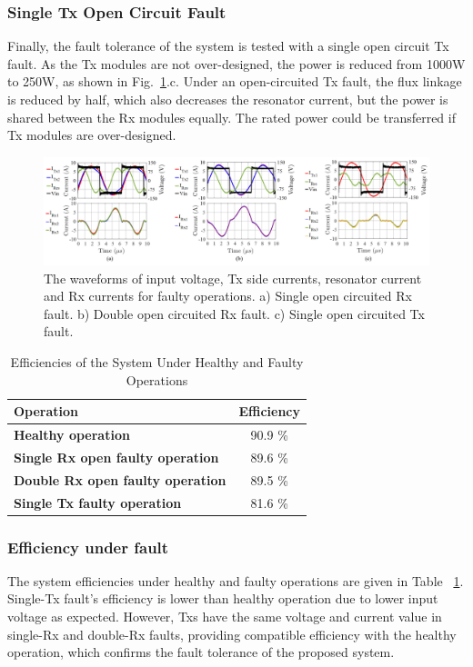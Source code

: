 \documentclass[journal]{IEEEtran}
\begin{document}
\subsubsection{Single Tx Open Circuit Fault}
Finally, the fault tolerance of the system is tested with a single open circuit Tx fault. 
As the Tx modules are not over-designed, the power is reduced from 1000W to 250W, as shown in Fig.~\ref{fig:results}.c.
Under an open-circuited Tx fault, the flux linkage is reduced by half, which also decreases the resonator current, but the power is shared between the Rx modules equally.
The rated power could be transferred if Tx modules are over-designed.

 \begin{figure}[]
     \centering
        	\includegraphics[width=1\linewidth]{faulty_new3.png}
        \caption{The waveforms of input voltage, Tx side currents, resonator current and Rx currents for faulty operations. a) Single open circuited Rx fault. b) Double open circuited Rx fault. c) Single open circuited Tx fault. }
        \label{fig:results}
\end{figure}

\begin{table}[h!]
\centering
\caption{Efficiencies of the System Under Healthy and Faulty Operations }
\label{tab:efficiency}
\begin{tabular}{lc}
\centering
\textbf{Operation} & Efficiency\\
\hline
\textbf{Healthy operation} &  90.9 \% \\
\textbf{Single Rx open faulty operation} &  89.6 \% \\
\textbf{Double Rx open faulty operation}  & 89.5   \%  \\
\textbf{Single Tx faulty operation}&  81.6  \%  \\
\hline
\end{tabular}
\end{table}

\subsubsection{Efficiency under fault}
The system efficiencies under healthy and faulty operations are given in Table~ \ref{tab:efficiency}.
Single-Tx fault's efficiency is lower than healthy operation due to lower input voltage as expected.
However, Txs have the same voltage and current value in single-Rx and double-Rx faults, providing compatible efficiency with the healthy operation, which confirms the fault tolerance of the proposed system. 
\end{document}
